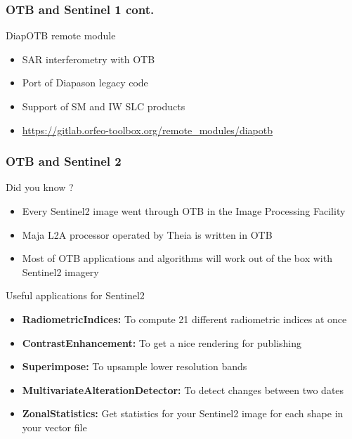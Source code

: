 \documentclass[8pt,aspectratio=169]{beamer}
\begin{document}
    \begin{frame}
    \frametitle{OTB and Sentinel 1 cont.}

    \begin{block}{DiapOTB remote module}
      \begin{itemize}
      \item SAR interferometry with OTB
      \item Port of Diapason legacy code
      \item Support of SM and IW SLC products
      \item \small{\url{https://gitlab.orfeo-toolbox.org/remote_modules/diapotb}}
      \end{itemize}
    \end{block}
    
    \end{frame}

      \begin{frame}
        \frametitle{OTB and Sentinel 2}

        \begin{block}{Did you know ?}
          \begin{itemize}
          \item Every Sentinel2 image went through OTB in the Image Processing Facility
          \item Maja L2A processor operated by Theia is written in OTB
          \item Most of OTB applications and algorithms will work out of the box with Sentinel2 imagery
          \end{itemize}
        \end{block}
        \begin{block}{Useful applications for Sentinel2}
          \begin{itemize}
          \item \textbf{RadiometricIndices:} To compute 21 different radiometric indices at once
          \item \textbf{ContrastEnhancement:} To get a nice rendering for publishing
          \item \textbf{Superimpose:} To upsample lower resolution bands 
          \item \textbf{MultivariateAlterationDetector:} To detect changes between two dates
          \item \textbf{ZonalStatistics:} Get statistics for your Sentinel2 image for each shape in your vector file
            \end{itemize}
          \end{block}
      \end{frame}
      
\end{document}
